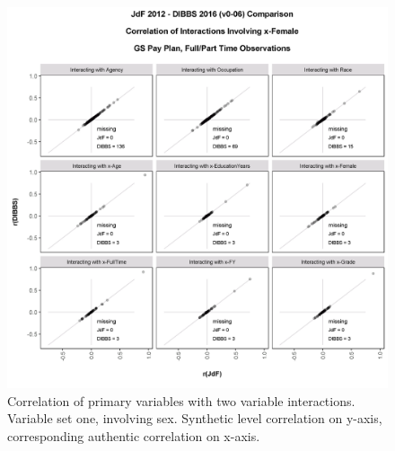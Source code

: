 \documentclass[10pt, letterpaper]{article}
\begin{document}
\begin{spacing}{1.0}
\vspace{20pt}

\begin{figure}[h]
    \centering
    \includegraphics[width=5in, trim={0 0.2in 0 1in}, clip]{JdFDIBBSCorrelationInteraction-x-Female.png}
    \caption{Correlation of primary variables with two variable interactions.  Variable set one, involving sex.  Synthetic level correlation on y-axis, corresponding authentic correlation on x-axis.}
    \label{figure:JdFDIBBSCorrelationInteraction1}
\end{figure}

\clearpage


\end{spacing}
\end{document}
